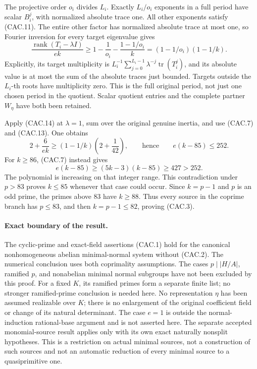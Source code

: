 The projective order \(o_i\) divides \(L_i\).
Exactly \(L_i/o_i\) exponents in a full period have scalar
\(B_i^j\), with normalized absolute trace one.
All other exponents satisfy (CAC.11).
The entire other factor has normalized absolute trace at most
one, so Fourier inversion for every target eigenvalue gives
\[
 \frac{\operatorname{rank}(T_i-\lambda I)}{ek}
 \ge 1-\frac1{o_i}-\frac{1-1/o_i}{k}
 =(1-1/o_i)(1-1/k).
 \tag{CAC.14}
\]
Explicitly, its target multiplicity is
\(L_i^{-1}\sum_{j=0}^{L_i-1}\lambda^{-j}
\operatorname{tr}(T_i^j)\), and its absolute value is at most
the sum of the absolute traces just bounded.
Targets outside the \(L_i\)-th roots have multiplicity zero.
This is the full original period, not just one chosen period
in the quotient. Scalar quotient entries and the complete
partner \(W_\eta\) have both been retained.

Apply (CAC.14) at \(\lambda=1\), sum over the original genuine
inertia, and use (CAC.7) and (CAC.13). One obtains
\[
 2+\frac6{ek}
 \ge(1-1/k)\left(2+\frac1{42}\right),
 \qquad\text{hence}\qquad e(k-85)\le252.
 \tag{CAC.15}
\]
For \(k\ge86\), (CAC.7) instead gives
\[
 e(k-85)\ge(5k-3)(k-85)\ge427>252.
 \tag{CAC.16}
\]
The polynomial is increasing on that integer range.
This contradiction under \(p>83\) proves \(k\le85\) whenever
that case could occur. Since \(k=p-1\) and \(p\) is an odd prime,
the primes above \(83\) have \(k\ge88\).
Thus every source in the coprime branch has \(p\le83\),
and then \(k=p-1\le82\), proving (CAC.3).

\paragraph{Exact boundary of the result.}
The cyclic-prime and exact-field assertions (CAC.1) hold for the
canonical nonhomogeneous abelian minimal-normal system without
(CAC.2). The numerical conclusion uses both coprimality assumptions.
The cases \(p\mid|H/A|\), ramified \(p\), and nonabelian minimal
normal subgroups have not been excluded by this proof.
For a fixed \(K\), its ramified primes form a separate finite list;
no stronger ramified-prime conclusion is needed here.
No representation \(\eta\) has been assumed realizable over \(K\);
there is no enlargement of the original coefficient field or change
of its natural determinant. The case \(e=1\) is outside the
normal-induction rational-base argument and is not asserted here.
The separate accepted monomial-source result applies only with its
own exact naturally nonsplit hypotheses.
This is a restriction on actual minimal sources, not a construction
of such sources and not an automatic reduction of every minimal
source to a quasiprimitive one.
